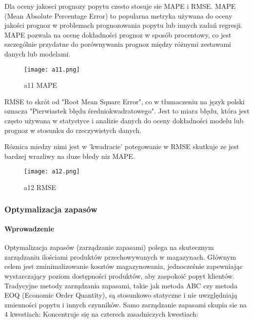 \cite{carb2006}\cite{Mary2022}\cite{wikknn2023}\cite{Shekh2018}\cite{Xiao2021}\cite{Resul2017}\cite{Farz2020}\cite{Carbo2007}\cite{Shahr2009}\cite{Gail2020}




Dla oceny jakosci prognozy popytu  czesto stosuje sie MAPE i RMSE.
MAPE (Mean Absolute Percentage Error) to popularna metryka używana do oceny jakości prognoz w problemach prognozowania popytu lub innych zadań regresji. MAPE pozwala na ocenę dokładności prognoz w sposób procentowy, co jest szczególnie przydatne do porównywania prognoz między różnymi zestawami danych lub modelami.


\begin{figure}[h!]
    \label{fig:a11}
    \centering \texttt{[image: a11.png]}
    \caption{a11 MAPE \cite{Shekh2018}}
\end{figure}
RMSE to skrót od "Root Mean Square Error", co w tłumaczeniu na język polski oznacza "Pierwiastek błędu średniokwadratowego". Jest to miara błędu, która jest często używana w statystyce i analizie danych do oceny dokładności modelu lub prognoz w stosunku do rzeczywistych danych.

Róznica miedzy nimi jest w 'kwadracie' potegowanie w RMSE skutkuje ze jest bardzej wrazliwy na duze błedy niz MAPE.



\begin{figure}[h!]
    \label{fig:a12}
    \centering \texttt{[image: a12.png]}
    \caption{a12 RMSE \cite{vis2023}\cite{Smir2021}}
\end{figure}




\newpage
\subsubsection{Optymalizacja zapasów}

\paragraph{Wprowadzenie}


Optymalizacja zapasów (zarządzanie zapasami) polega na skutecznym zarządzaniu ilościami produktów przechowywanych w magazynach. Głównym celem jest zminimalizowanie kosztów magazynowania, jednocześnie zapewniając wystarczający poziom dostępności produktów, aby zaspokoić popyt klientów. Tradycyjne metody zarządzania zapasami, takie jak metoda ABC czy metoda EOQ (Economic Order Quantity), są stosunkowo statyczne i nie uwzględniają zmienności popytu i innych czynników.
Samo zarządzanie zapasami skupia sie na 4 kwestiach:
Koncentruje się na czterech zasadniczych kwestiach:

